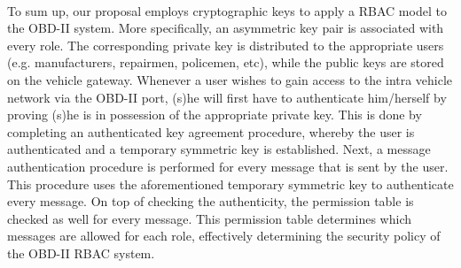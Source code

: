 \paragraph{}
To sum up, our proposal employs cryptographic keys to apply a RBAC model to the OBD-II system. More specifically, an asymmetric key pair is associated with every role. The corresponding private key is distributed to the appropriate users (e.g. manufacturers, repairmen, policemen, etc), while the public keys are stored on the vehicle gateway. Whenever a user wishes to gain access to the intra vehicle network via the OBD-II port, (s)he will first have to authenticate him/herself by proving (s)he is in possession of the appropriate private key. This is done by completing an authenticated key agreement procedure, whereby the user is authenticated and a temporary symmetric key is established. Next, a message authentication procedure is performed for every message that is sent by the user. This procedure uses the aforementioned temporary symmetric key to authenticate every message. On top of checking the authenticity, the permission table is checked as well for every message. This permission table determines which messages are allowed for each role, effectively determining the security policy of the OBD-II RBAC system.



